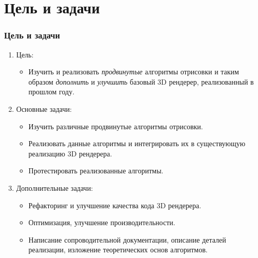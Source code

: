 \documentclass{beamer}
\begin{document}
	\section{Цель и задачи}
	\begin{frame}
		\frametitle{Цель и задачи}
		
		\begin{enumerate}
			\item<1-> Цель:
			\begin{itemize}
				\item<1-> Изучить и реализовать \textit{продвинутые} алгоритмы отрисовки и таким образом \textit{дополнить} и \textit{улучшить} базовый 3D рендерер, реализованный в прошлом году.
			\end{itemize}
			\item<2-> Основные задачи:
			\begin{itemize}
				\item<2-> Изучить различные продвинутые алгоритмы отрисовки.
				\item<2-> Реализовать данные алгоритмы и интегрировать их в существующую реализацию 3D рендерера.
				\item<2-> Протестировать реализованные алгоритмы.
			\end{itemize}
			\item<3-> Дополнительные задачи:
			\begin{itemize}
				\item<3-> Рефакторинг и улучшение качества кода 3D рендерера.
				\item<3-> Оптимизация, улучшение производительности.
				\item<3-> Написание сопроводительной документации, описание деталей реализации, изложение теоретических основ алгоритмов.
			\end{itemize}
		\end{enumerate}
	\end{frame}
	
\end{document}
